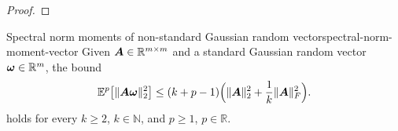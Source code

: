 \begin{proof}
\end{proof}



\begin{lemma}{Spectral norm moments of non-standard Gaussian random vector}{spectral-norm-moment-vector}
    Given $\boldsymbol{A} \in \mathbb{R}^{m \times m}$ and a standard Gaussian random vector $\boldsymbol{\omega} \in \mathbb{R}^{m}$, the bound
    \[
        \mathbb{E}^{p}\big[ \lVert \boldsymbol{A} \boldsymbol{\omega} \rVert _2^2 \big]
        \leq  (k + p - 1) \Big( \lVert \boldsymbol{A} \rVert _2^2 + \frac{1}{k} \lVert \boldsymbol{A} \rVert _F^2 \Big).
    \]
    holds for every $k \ge 2$, $k\in \mathbb{N}$, and $p \ge 1$, $p\in \mathbb R$.
\end{lemma}
